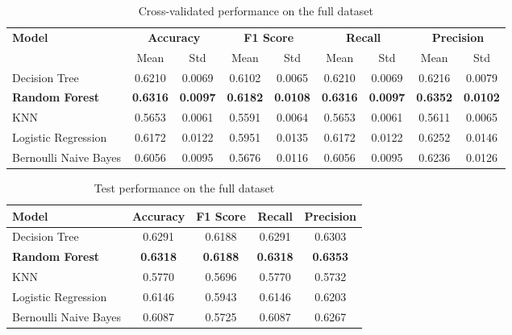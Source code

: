 \begin{table}[ht]
\centering
\caption{Cross-validated performance on the full dataset}
\label{tab:cv_performance_fd}
\renewcommand{\arraystretch}{1.2}
\begin{tabular}{lcccccccc}
\hline
\textbf{Model} & \multicolumn{2}{c}{\textbf{Accuracy}} & \multicolumn{2}{c}{\textbf{F1 Score}} & \multicolumn{2}{c}{\textbf{Recall}} & \multicolumn{2}{c}{\textbf{Precision}} \\
 & Mean & Std & Mean & Std & Mean & Std & Mean & Std \\
\hline
Decision Tree & 0.6210 & 0.0069 & 0.6102 & 0.0065 & 0.6210 & 0.0069 & 0.6216 & 0.0079 \\
\textbf{Random Forest} & \textbf{0.6316} & \textbf{0.0097} & \textbf{0.6182} & \textbf{0.0108} & \textbf{0.6316} & \textbf{0.0097} & \textbf{0.6352} & \textbf{0.0102} \\
KNN & 0.5653 & 0.0061 & 0.5591 & 0.0064 & 0.5653 & 0.0061 & 0.5611 & 0.0065 \\
Logistic Regression & 0.6172 & 0.0122 & 0.5951 & 0.0135 & 0.6172 & 0.0122 & 0.6252 & 0.0146 \\
Bernoulli Naive Bayes & 0.6056 & 0.0095 & 0.5676 & 0.0116 & 0.6056 & 0.0095 & 0.6236 & 0.0126 \\
\hline
\end{tabular}
\end{table}

\begin{table}[ht]
\centering
\caption{Test performance on the full dataset}
\label{tab:test_performance_fd}
\begin{tabular}{lcccc}
\toprule
\textbf{Model} & \textbf{Accuracy} & \textbf{F1 Score} & \textbf{Recall} & \textbf{Precision} \\
\midrule
Decision Tree & 0.6291 & 0.6188 & 0.6291 & 0.6303 \\
\textbf{Random Forest} & \textbf{0.6318} & \textbf{0.6188} & \textbf{0.6318} & \textbf{0.6353} \\
KNN & 0.5770 & 0.5696 & 0.5770 & 0.5732 \\
Logistic Regression & 0.6146 & 0.5943 & 0.6146 & 0.6203 \\
Bernoulli Naive Bayes & 0.6087 & 0.5725 & 0.6087 & 0.6267 \\
\bottomrule
\end{tabular}
\end{table}

